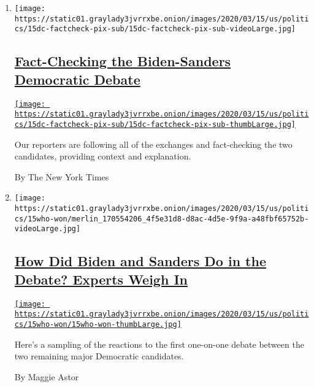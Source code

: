 \begin{enumerate}
\def\labelenumi{\arabic{enumi}.}
\item
  \texttt{[image: https://static01.graylady3jvrrxbe.onion/images/2020/03/15/us/politics/15dc-factcheck-pix-sub/15dc-factcheck-pix-sub-videoLarge.jpg]}

  \hypertarget{fact-checking-the-biden-sanders-democratic-debate}{%
  \subsection{\texorpdfstring{\href{/2020/03/15/us/politics/democratic-debate-fact-check.html}{Fact-Checking
  the Biden-Sanders Democratic
  Debate}}{Fact-Checking the Biden-Sanders Democratic Debate}}\label{fact-checking-the-biden-sanders-democratic-debate}}

  \href{/2020/03/15/us/politics/democratic-debate-fact-check.html}{\texttt{[image: https://static01.graylady3jvrrxbe.onion/images/2020/03/15/us/politics/15dc-factcheck-pix-sub/15dc-factcheck-pix-sub-thumbLarge.jpg]}}

  Our reporters are following all of the exchanges and fact-checking the
  two candidates, providing context and explanation.

  By The New York Times
\item
  \texttt{[image: https://static01.graylady3jvrrxbe.onion/images/2020/03/15/us/politics/15who-won/merlin\_170554206\_4f5e31d8-d8ac-4d5e-9f9a-a48fbf65752b-videoLarge.jpg]}

  \hypertarget{how-did-biden-and-sanders-do-in-the-debate-experts-weigh-in}{%
  \subsection{\texorpdfstring{\href{/2020/03/15/us/politics/who-won-democratic-debate.html}{How
  Did Biden and Sanders Do in the Debate? Experts Weigh
  In}}{How Did Biden and Sanders Do in the Debate? Experts Weigh In}}\label{how-did-biden-and-sanders-do-in-the-debate-experts-weigh-in}}

  \href{/2020/03/15/us/politics/who-won-democratic-debate.html}{\texttt{[image: https://static01.graylady3jvrrxbe.onion/images/2020/03/15/us/politics/15who-won/15who-won-thumbLarge.jpg]}}

  Here's a sampling of the reactions to the first one-on-one debate
  between the two remaining major Democratic candidates.

  By Maggie Astor
\end{enumerate}

